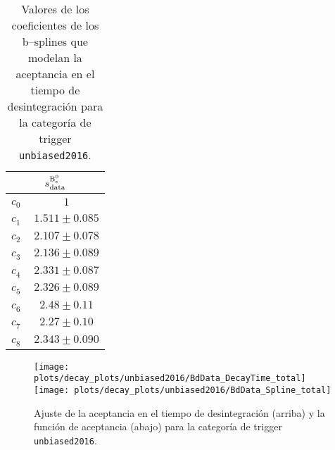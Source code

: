 \begin{table}[H]
\begin{multicols}{3}
\begin{tabular}{cc}
\toprule 
\multicolumn{2}{c}{$s_{\text{data}}^{\text{B}{}_{\text{s}}^{0}}$} \\ \midrule
$ c_0^{\phantom{B}} $&$   1                  $\\
$ c_1^{\phantom{B}} $&$   1.511 \pm 0.085    $\\
$ c_2^{\phantom{B}} $&$   2.107 \pm 0.078    $\\
$ c_3^{\phantom{B}} $&$   2.136 \pm 0.089    $\\
$ c_4^{\phantom{B}} $&$   2.331 \pm 0.087    $\\
$ c_5^{\phantom{B}} $&$   2.326 \pm 0.089    $\\
$ c_6^{\phantom{B}} $&$   2.48  \pm 0.11     $\\
$ c_7^{\phantom{B}} $&$   2.27  \pm 0.10     $\\
$ c_8^{\phantom{B}} $&$   2.343 \pm 0.090    $\\
\bottomrule
\end{tabular}

\end{multicols}
\caption{Valores de los coeficientes de los b--splines que modelan la aceptancia en el tiempo de desintegración para la categoría de trigger \texttt{unbiased2016}.} \label{tab:acctimebsdataunbiased2016}
\end{table}


\newpage
\vspace*{\fill}
\begin{figure}[H]
\centering
\texttt{[image: plots/decay\_plots/unbiased2016/BdData\_DecayTime\_total]}
\texttt{[image: plots/decay\_plots/unbiased2016/BdData\_Spline\_total]}
\caption{Ajuste de la aceptancia en el tiempo de desintegración (arriba) y la función de aceptancia (abajo) para la categoría de trigger \texttt{unbiased2016}.}  \label{fig:acctimebsdataunbiased2016}
\end{figure}
\vspace*{\fill}
\newpage

